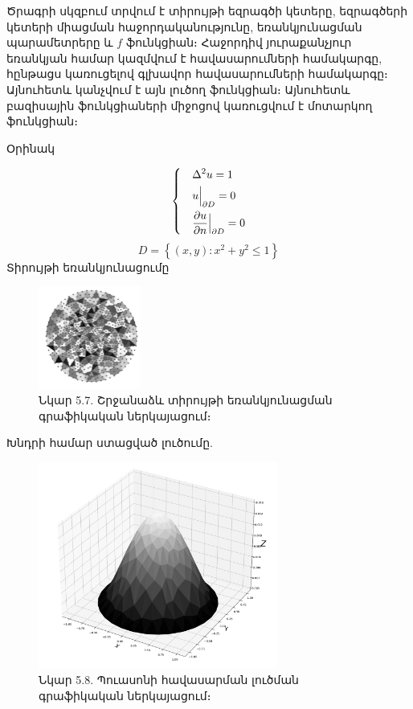 \documentclass[fleqn, bachelor,subf,12pt,notitlepage]{article}
\begin{document}
Ծրագրի սկզբում տրվում է տիրույթի եզրագծի կետերը, եզրագծերի կետերի միացման հաջորդականությունը, եռանկյունացման պարամետրերը և $f$ ֆունկցիան։ Հաջորդիվ յուրաքանչյուր եռանկյան համար կազմվում է հավասարումների համակարգը, հընթացս կառուցելով գլխավոր հավասարումների համակարգը։ Այնուհետև կանչվում է այն լուծող ֆունկցիան։ Այնուհետև բազիսային ֆունկցիաների միջոցով կառուցվում է մոտարկող ֆունկցիան։

Օրինակ

$$
\begin{dcases}
&\Delta^{2} u = 1 \\
&u \Big |_{\partial D} = 0\\
&\dfrac{\partial u}{\partial n} \Big |_{\partial D} = 0
\end{dcases}
$$
$$ D = \left\{\left(x,y\right): x^{2}+y^{2} \leq 1\right\}$$
Տիրույթի եռանկյունացումը
\begin{figure}[H]
\centering
\includegraphics[width=0.3\textwidth]{images/circle_mesh_quad_biharmonic}
\captionsetup{labelformat=empty}
\caption{Նկար 5.7. Շրջանաձև տիրույթի եռանկյունացման գրաֆիկական ներկայացում։}
\end{figure}
\newpage
Խնդրի համար ստացված լուծումը.
\begin{figure}[H]
\centering
\includegraphics[width=0.7\textwidth]{images/biharmonic_equation_solution_argyris_function_value}
\captionsetup{labelformat=empty}
\caption{Նկար 5.8. Պուասոնի հավասարման լուծման գրաֆիկական ներկայացում։}
\end{figure}
\end{document}

